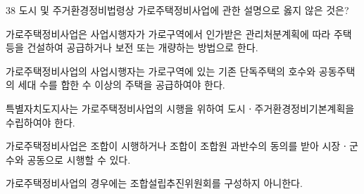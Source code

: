 \begin{question}{38}
도시 및 주거환경정비법령상 가로주택정비사업에 관한 설명으로 옳지 않은 것은?
\begin{choices}
  \item 가로주택정비사업은 사업시행자가 가로구역에서 인가받은 관리처분계획에 따라 주택 등을 건설하여 공급하거나 보전 또는 개량하는 방법으로 한다.
  \item 가로주택정비사업의 사업시행자는 가로구역에 있는 기존 단독주택의 호수와 공동주택의 세대 수를 합한 수 이상의 주택을 공급하여야 한다.
  \item 특별자치도지사는 가로주택정비사업의 시행을 위하여 도시ㆍ주거환경정비기본계획을 수립하여야 한다.
  \item 가로주택정비사업은 조합이 시행하거나 조합이 조합원 과반수의 동의를 받아 시장ㆍ군수와 공동으로 시행할 수 있다.
  \item 가로주택정비사업의 경우에는 조합설립추진위원회를 구성하지 아니한다.
\end{choices}
\end{question}

